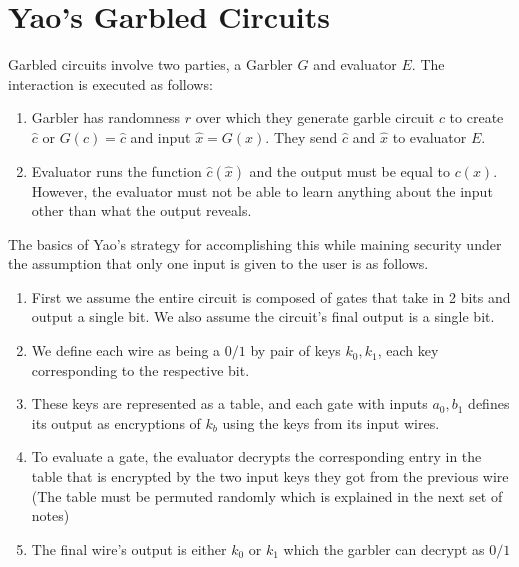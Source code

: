 \documentclass[11pt]{article}
\begin{document}
\section{Yao's Garbled Circuits}
Garbled circuits involve two parties, a Garbler $G$ and evaluator $E$. The interaction is executed as follows:
\begin{enumerate}
    \item Garbler has randomness $r$ over which they generate garble circuit $c$ to create $\hat{c}$ or $G(c) = \hat{c}$ and input $\hat{x} = G(x)$. They send $\hat{c}$ and $\hat{x}$ to evaluator $E$.
    \item Evaluator runs the function $\hat{c}(\hat{x})$ and the output must be equal to $c(x)$. However, the evaluator must not be able to learn anything about the input other than what the output reveals.
\end{enumerate}
The basics of Yao's strategy for accomplishing this while maining security under the assumption that only one input is given to the user is as follows.
\begin{enumerate}
    \item First we assume the entire circuit is composed of gates that take in 2 bits and output a single bit. We also assume the circuit's final output is a single bit.
    \item We define each wire as being a $0/1$ by pair of keys $k_0, k_1$, each key corresponding to the respective bit.
    \item These keys are represented as a table, and each gate with inputs $a_0,b_1$ defines its output as encryptions of $k_b$ using the keys from its input wires.
    \item To evaluate a gate, the evaluator decrypts the corresponding entry in the table that is encrypted by the two input keys they got from the previous wire (The table must be permuted randomly which is explained in the next set of notes)
    \item The final wire's output is either $k_0$ or $k_1$ which the garbler can decrypt as $0/1$
\end{enumerate}
\end{document}
